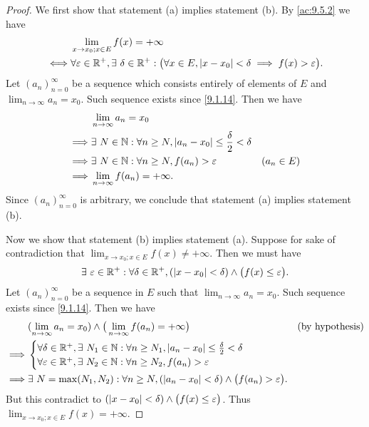 \begin{proof}
  We first show that statement (a) implies statement (b).
  By \cref{ac:9.5.2} we have
  \begin{align*}
         & \lim_{x \to x_0 ; x \in E} f(x) = +\infty                                                                                               \\
    \iff & \forall \varepsilon \in \mathbb{R}^+, \exists\ \delta \in \mathbb{R}^+ : \big(\forall x \in E, \left\lvert x - x_0\right\rvert < \delta \implies f(x) > \varepsilon\big).
  \end{align*}
  Let \((a_n)_{n = 0}^\infty\) be a sequence which consists entirely of elements of \(E\) and \(\lim_{n \to \infty} a_n = x_0\).
  Such sequence exists since \cref{9.1.14}.
  Then we have
  \begin{align*}
             & \lim_{n \to \infty} a_n = x_0                                                                      \\
    \implies & \exists\ N \in \mathbb{N} : \forall n \geq N, \left\lvert a_n - x_0\right\rvert \leq \frac{\delta}{2} < \delta               \\
    \implies & \exists\ N \in \mathbb{N} : \forall n \geq N, f(a_n) > \varepsilon                           & (a_n \in E) \\
    \implies & \lim_{n \to \infty} f(a_n) = +\infty.
  \end{align*}
  Since \((a_n)_{n = 0}^\infty\) is arbitrary, we conclude that statement (a) implies statement (b).

  Now we show that statement (b) implies statement (a).
  Suppose for sake of contradiction that \(\lim_{x \to x_0 ; x \in E} f(x) \neq +\infty\).
  Then we must have
  \[
    \exists\ \varepsilon \in \mathbb{R}^+ : \forall \delta \in \mathbb{R}^+, (\left\lvert x - x_0\right\rvert < \delta) \land \big(f(x) \leq \varepsilon\big).
  \]
  Let \((a_n)_{n = 0}^\infty\) be a sequence in \(E\) such that \(\lim_{n \to \infty} a_n = x_0\).
  Such sequence exists since \cref{9.1.14}.
  Then we have
  \begin{align*}
             & (\lim_{n \to \infty} a_n = x_0) \land \big(\lim_{n \to \infty} f(a_n) = +\infty\big)                                 & \text{(by hypothesis)} \\
    \implies & \begin{cases}
                 \forall \delta \in \mathbb{R}^+, \exists\ N_1 \in \mathbb{N} : \forall n \geq N_1, \left\lvert a_n - x_0\right\rvert \leq \frac{\delta}{2} < \delta \\
                 \forall \varepsilon \in \mathbb{R}^+, \exists\ N_2 \in \mathbb{N} : \forall n \geq N_2, f(a_n) > \varepsilon
               \end{cases}                             \\
    \implies & \exists\ N = \max(N_1, N_2) : \forall n \geq N, (\left\lvert a_n - x_0\right\rvert < \delta) \land \big(f(a_n) > \varepsilon\big).
  \end{align*}
  But this contradict to \((\left\lvert x - x_0\right\rvert < \delta) \land \big(f(x) \leq \varepsilon\big)\).
  Thus \(\lim_{x \to x_0 ; x \in E} f(x) = +\infty\).
\end{proof}

